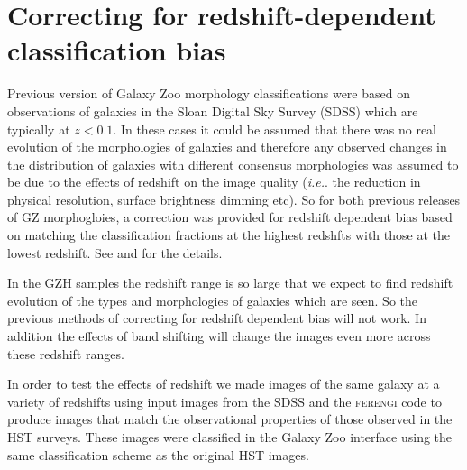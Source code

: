 \documentclass[usenatbib]{mn2e}
\newcommand{\ie}{{\it i.e.}}
\newcommand{\ferengi}{\textsc{ferengi}}
\begin{document}
\section{Correcting for redshift-dependent classification bias}

Previous version of Galaxy Zoo morphology classifications \citep{lin08,wil13} were based on observations of galaxies in the Sloan Digital Sky Survey (SDSS) which are typically at $z<0.1$. In these cases it could be assumed that there was no real evolution of the morphologies of galaxies and therefore any observed changes in the distribution of galaxies with different consensus morphologies was assumed to be due to the effects of redshift on the image quality (\ie. the reduction in physical resolution, surface brightness dimming etc). So for both previous releases of GZ morphogloies, a correction was provided for redshift dependent bias based on matching the classification fractions at the highest redshfts with those at the lowest redshift. See \citet{bam09} and \citet{wil13} for the details. 

In the GZH samples the redshift range is so large that we expect to find redshift evolution of the types and morphologies of galaxies which are seen. So the previous methods of correcting for redshift dependent bias will not work. In addition the effects of band shifting will change the images even more across these redshift ranges. %


In order to test the effects of redshift we made images of the same galaxy at a variety of redshifts using input images from the SDSS \citep{yor00,str02} and the \ferengi{} code \citep{bar08a} to produce images that match the observational properties of those observed in the HST surveys. These images were classified in the Galaxy Zoo interface using the same classification scheme as the original HST images.
 
\end{document}
